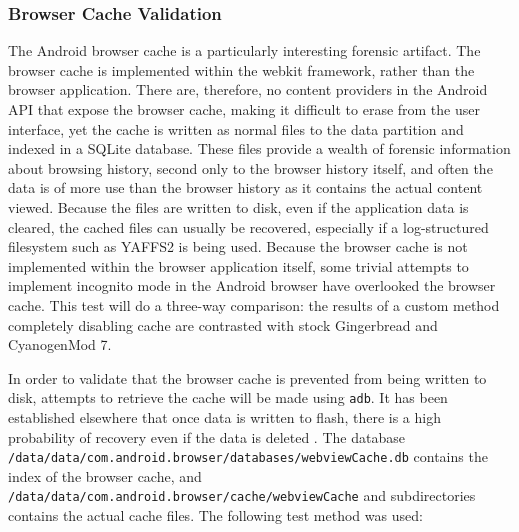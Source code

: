 \subsubsection{Browser Cache Validation}
The Android browser cache is a particularly interesting forensic artifact.  The browser cache is implemented within the webkit
framework, rather than the browser application.  There are, therefore, no content providers in the Android API that expose the
browser cache, making it difficult to erase from the user interface, yet the cache is written as normal files to the data partition
and indexed in a SQLite database.  These files provide a wealth of forensic information about browsing history, second only to the
browser history itself, and often the data is of more use than the browser history as it contains the actual content viewed.
Because the files are written to disk, even if the application data is cleared, the cached files can usually be recovered,
especially if a log-structured filesystem such as YAFFS2 is being used.  Because the browser cache is not implemented within the
browser application itself, some trivial attempts to implement incognito mode in the Android browser have overlooked the browser
cache.  This test will do a three-way comparison: the results of a custom method completely disabling cache are contrasted with
stock Gingerbread and CyanogenMod 7.

In order to validate that the browser cache is prevented from being written to disk, attempts to retrieve the cache will be made using
\texttt{adb}.  It has been established elsewhere that once data is written to flash, there is a high probability of recovery even if
the data is deleted \cite{naval}. The database \texttt{/data/data/com.android.browser/databases/webviewCache.db} contains the index of the
browser cache, and \texttt{/data/data/com.android.browser/cache/webviewCache} and subdirectories contains the actual cache files.
The following test method was used:

